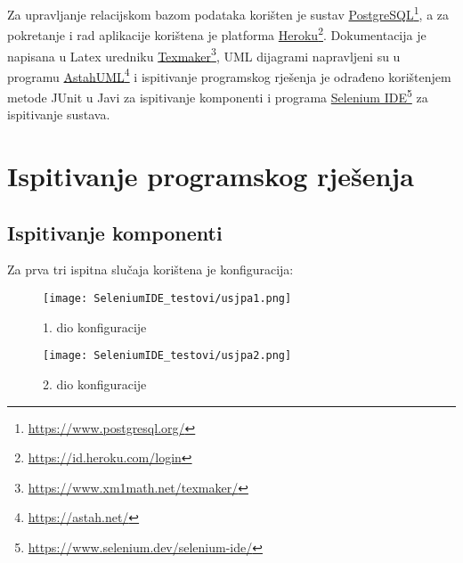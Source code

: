 			Za upravljanje relacijskom bazom podataka korišten je sustav \underline{PostgreSQL}\footnote{\url{https://www.postgresql.org/}}, a za pokretanje i rad aplikacije korištena je platforma \underline{Heroku}\footnote{\url{https://id.heroku.com/login}}. Dokumentacija je napisana u Latex uredniku \underline{Texmaker}\footnote{\url{https://www.xm1math.net/texmaker/}}, UML dijagrami napravljeni su u programu \underline{AstahUML}\footnote{\url{https://astah.net/}} i ispitivanje programskog rješenja je odrađeno korištenjem metode JUnit u Javi za ispitivanje komponenti i programa \underline{Selenium IDE}\footnote{\url{https://www.selenium.dev/selenium-ide/}} za ispitivanje sustava.
			
			\eject

	
		\section{Ispitivanje programskog rješenja}
			
%			

			
			\subsection{Ispitivanje komponenti}

Za prva tri ispitna slučaja korištena je konfiguracija:

				\begin{figure}[H]
					\texttt{[image: SeleniumIDE\_testovi/usjpa1.png]}
					\centering
					\caption{1. dio konfiguracije}
					\label{fig:konf1}
				\end{figure}
				
				\begin{figure}[H]
					\texttt{[image: SeleniumIDE\_testovi/usjpa2.png]}
					\centering
					\caption{2. dio konfiguracije}
					\label{fig:konf2}
				\end{figure}


